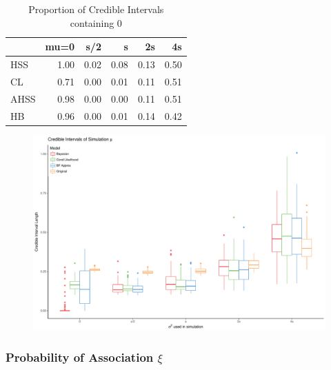 \documentclass[AMA,STIX1COL]{WileyNJD-v2}\usepackage[]{graphicx}\usepackage[]{color}
\newenvironment{knitrout}{}{} %
\begin{document}
\begin{knitrout}
\color{fgcolor}\begin{table}

\caption{\label{tab:unnamed-chunk-23}Proportion of Credible Intervals containing 0}
\centering
\begin{tabular}[t]{l|r|r|r|r|r}
\hline
  & mu=0 & s/2 & s & 2s & 4s\\
\hline
HSS & 1.00 & 0.02 & 0.08 & 0.13 & 0.50\\
\hline
CL & 0.71 & 0.00 & 0.01 & 0.11 & 0.51\\
\hline
AHSS & 0.98 & 0.00 & 0.00 & 0.11 & 0.51\\
\hline
HB & 0.96 & 0.00 & 0.01 & 0.14 & 0.42\\
\hline
\end{tabular}
\end{table}


\end{knitrout}


\begin{figure}
\begin{knitrout}
\color{fgcolor}

{\centering \includegraphics[width=6in]{figure/unnamed-chunk-24-1} 

}



\end{knitrout}
\end{figure}

\subsubsection{Probability of Association $\xi$}
\end{document}
